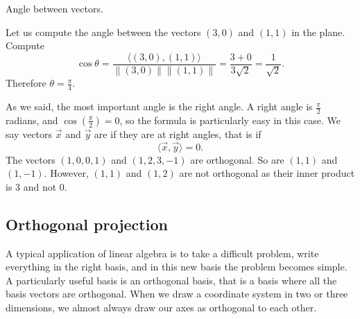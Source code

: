\documentclass{ximera}
\begin{document}
\begin{myfig}
    \capstart
    
    \caption{Angle between vectors.\label{vec-angle:fig}}
\end{myfig}

\begin{example}
    Let us compute the angle between the vectors $(3,0)$ and $(1,1)$ in the plane. Compute
    \begin{equation*}
        \cos \theta = \frac{\bigl\langle (3,0) , (1,1) \bigr\rangle}{\lVert(3,0)\rVert \lVert(1,1)\rVert} = \frac{3 + 0}{3 \sqrt{2}} = \frac{1}{\sqrt{2}} .
    \end{equation*}
    Therefore $\theta = \frac{\pi}{4}$.
\end{example}

%

As we said, the most important angle is the right angle.  A right angle is $\frac{\pi}{2}$ radians, and $\cos (\frac{\pi}{2}) = 0$, so the formula is particularly easy in this case. We say vectors $\vec{x}$ and $\vec{y}$ are \emph{} if they are at right angles, that is if
\begin{equation*}
    \langle \vec{x} , \vec{y} \rangle = 0 .
\end{equation*}
The vectors $(1,0,0,1)$ and $(1,2,3,-1)$ are orthogonal.  So are $(1,1)$ and $(1,-1)$.  However, $(1,1)$ and $(1,2)$ are not orthogonal as their inner product is $3$ and not 0.

\subsection{Orthogonal projection}

A typical application of linear algebra is to take a difficult problem, write everything in the right basis, and in this new basis the problem becomes simple.  A particularly useful basis is an orthogonal basis, that is a basis where all the basis vectors are orthogonal.  When we draw a coordinate system in two or three dimensions, we almost always draw our axes as orthogonal to each other.
\end{document}
